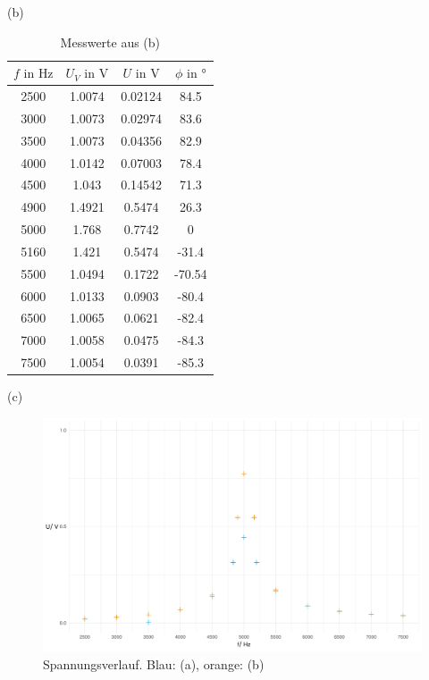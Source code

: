 \documentclass[a4paper, 12pt]{article}
\begin{document}
      \pagebreak
      \noindent (b)\\
        \begin{table}[H]
        \begin{center}
        \begin{tabular}{@{}cccc@{}}
        \toprule
          $f \text{ in } \si{\hertz} $   &    $ U_V \text{ in } \si{\volt}$    &     $ U \text{ in } \si{\volt}$     &     $ \phi \text{ in } \si{\degree}$   \\ \midrule
        2500 & 1.0074 & 0.02124 & 84.5   \\
        3000 & 1.0073 & 0.02974 & 83.6   \\
        3500 & 1.0073 & 0.04356 & 82.9   \\
        4000 & 1.0142 & 0.07003 & 78.4   \\
        4500 & 1.043  & 0.14542 & 71.3   \\
        4900 & 1.4921 & 0.5474  & 26.3   \\
        5000 & 1.768  & 0.7742  & 0      \\
        5160 & 1.421  & 0.5474  & -31.4  \\
        5500 & 1.0494 & 0.1722  & -70.54 \\
        6000 & 1.0133 & 0.0903  & -80.4  \\
        6500 & 1.0065 & 0.0621  & -82.4  \\
        7000 & 1.0058 & 0.0475  & -84.3  \\
        7500 & 1.0054 & 0.0391  & -85.3  \\ \bottomrule
        \end{tabular}
        \caption*{Messwerte aus (b)}
        \end{center}
        \end{table}

      \noindent (c)\\


        \begin{figure}[H]
          \begin{center}
          \includegraphics[scale=0.3819660112501051]{./R/3_2/3_2_spannung.pdf}
          \caption*{Spannungsverlauf. Blau: (a), orange: (b)}
          \end{center}
        \end{figure}
\end{document}

